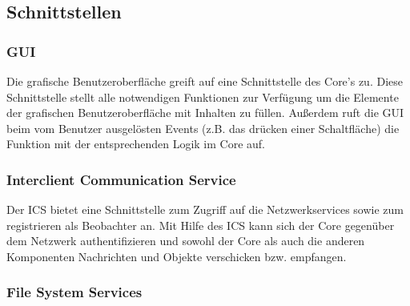 \subsection{Schnittstellen}

\subsubsection{GUI}
Die grafische Benutzeroberfläche greift auf eine Schnittstelle des Core's zu. Diese Schnittstelle stellt alle notwendigen Funktionen zur Verfügung um die Elemente der grafischen Benutzeroberfläche mit Inhalten zu füllen. Außerdem ruft die GUI beim vom Benutzer ausgelösten Events (z.B. das drücken einer Schaltfläche) die Funktion mit der entsprechenden Logik im Core auf.

\subsubsection{Interclient Communication Service}
Der ICS bietet eine Schnittstelle zum Zugriff auf die Netzwerkservices sowie zum registrieren als Beobachter an. Mit Hilfe des ICS kann sich der Core gegenüber dem Netzwerk authentifizieren und sowohl der Core als auch die anderen Komponenten Nachrichten und Objekte verschicken bzw. empfangen.

\subsubsection{File System Services}

